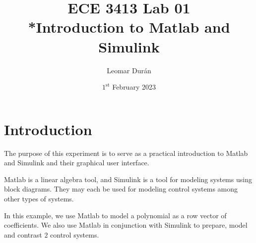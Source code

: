 \documentclass[12pt]{article}
\title{ECE 3413 Lab 01\\*Introduction to Matlab and Simulink}
\author{Leomar Dur\'an}
\date{$1^{\text{st}}$ February 2023}
\begin{document}
\maketitle

\section{Introduction}

The purpose of this experiment is to serve as a practical introduction to Matlab and Simulink and their graphical user interface.

Matlab is a linear algebra tool, and Simulink is a tool for modeling systems using block diagrams.
They may each be used for modeling control systems among other types of systems.

In this example, we use Matlab to model a polynomial as a row vector of coefficients. We also use Matlab in conjunction with Simulink to prepare, model and contrast $2$ control systems.
\end{document}

